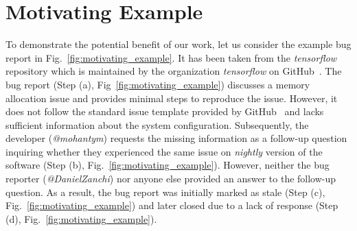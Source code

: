 \section{Motivating Example} \label{sec:motivating-example}



To demonstrate the potential benefit of our work, let us consider the example bug report in Fig.~\ref{fig:motivating_example}. It has been taken from the \emph{tensorflow} repository which is maintained by the organization \emph{tensorflow} on GitHub~\cite{MotivatingExampleTensorflow}. The bug report (Step (a), Fig~\ref{fig:motivating_example}) discusses a memory allocation issue and provides minimal steps to reproduce the issue. However, it does not follow the standard issue template provided by GitHub~\cite{issueTemplate_Github} and lacks sufficient information about the system configuration. Subsequently, the developer (\textit{@mohantym}) requests the missing information as a follow-up question inquiring whether 
they experienced the same issue on \textit{nightly} version of the software (Step (b), Fig.~\ref{fig:motivating_example}). However, neither the bug reporter (\textit{@DanielZanchi}) nor anyone else provided an answer to the follow-up question. As a result, the bug report was initially marked as stale (Step (c), Fig.~\ref{fig:motivating_example}) and later closed due to a lack of response (Step (d), Fig.~\ref{fig:motivating_example}).\par


